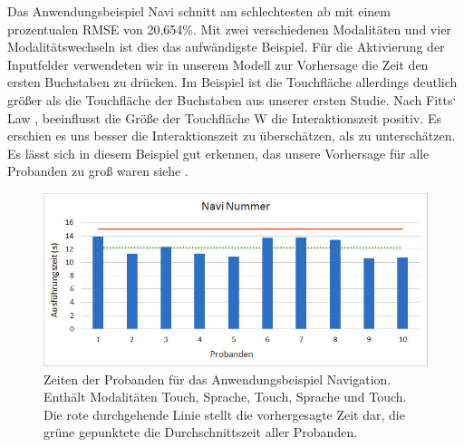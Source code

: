 Das Anwendungsbeispiel Navi schnitt am schlechtesten ab mit einem prozentualen RMSE von 20,654\%. Mit zwei verschiedenen Modalitäten und vier Modalitätswechseln ist dies das aufwändigste Beispiel. Für die Aktivierung der Inputfelder verwendeten wir in unserem Modell zur Vorhersage die Zeit den ersten Buchstaben zu drücken. Im Beispiel ist die Touchfläche allerdings deutlich größer als die Touchfläche der Buchstaben aus unserer ersten Studie. Nach Fitts` Law \citep{fitts1954information}, \citep{sasangohar2009evaluation}
beeinflusst die Größe der Touchfläche W die Interaktionszeit positiv. Es erschien es uns besser die Interaktionszeit zu überschätzen, als zu unterschätzen. Es lässt sich in diesem Beispiel gut erkennen, das unsere Vorhersage für alle Probanden zu groß waren siehe .
\begin{figure}[ht]
	\centering
		\includegraphics[width=1\textwidth]{img/Navi_Times.jpg}
	\caption[Zeiten der Probanden für das Anwendungsbeispiel Navigation.]{Zeiten der Probanden für das Anwendungsbeispiel Navigation. Enthält Modalitäten Touch, Sprache, Touch, Sprache und Touch. Die rote durchgehende Linie stellt die vorhergesagte Zeit dar, die grüne gepunktete die Durchschnittszeit aller Probanden.}
	\label{fig:Navi_Times}
\end{figure}

